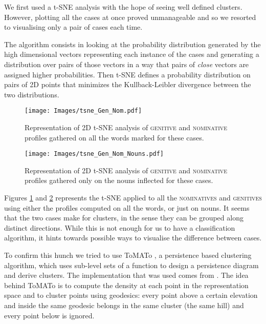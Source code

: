 \documentclass[11pt]{article}
\newcommand{\scsf}[1]{\textsc{\textsf{#1}}} %
\begin{document}
We first used a t-SNE analysis \cite{tSNE} with the hope of seeing well defined clusters.
However, plotting all the cases at once proved unmanageable and so we resorted to visualising only a pair of cases each time.

The algorithm consists in looking at the probability distribution generated by the high dimensional vectors representing each instance of the cases and generating a distribution over pairs of those vectors in a way that pairs of \emph{close} vectors are assigned higher probabilities. 
Then t-SNE defines a probability distribution on pairs of 2D points that minimizes the Kullback-Leibler divergence between the two distributions. 


\begin{figure}[h]
    \begin{center}
    \texttt{[image: Images/tsne\_Gen\_Nom.pdf]}
    \end{center}
    \caption{Representation of 2D t-SNE analysis of \scsf{genitive} and \scsf{nominative} profiles gathered on all the words marked for these cases.}
    \label{fig:tsne1}
\end{figure}

\begin{figure}[h]
    \begin{center}
    \texttt{[image: Images/tsne\_Gen\_Nom\_Nouns.pdf]}
    \end{center}
    \caption{Representation of 2D t-SNE analysis of \scsf{genitive} and \scsf{nominative} profiles gathered only on the nouns inflected for these cases.}
\label{fig:tsne2}
\end{figure}

Figures \ref{fig:tsne1} and \ref{fig:tsne2} represents the t-SNE applied to all the \scsf{nominatives} and \scsf{genitives} using either the profiles computed on all the words, or just on nouns.
It seems that the two cases make for clusters, in the sense they can be grouped along distinct directions. 
While this is not enough for us to have a classification algorithm, it hints towards possible ways to visualise the difference between cases. 

To confirm this hunch we tried to use ToMATo \cite{ToMATo}, a persistence based clustering algorithm, which uses sub-level sets of a function to design a persistence diagram and derive clusters. 
The implementation that was used comes from .
The idea behind ToMATo is to compute the density at each point in the representation space and to cluster points using geodesics: every point above a certain elevation and inside the same geodesic belongs in the same cluster (the same hill) and every point below is ignored.
\end{document}
